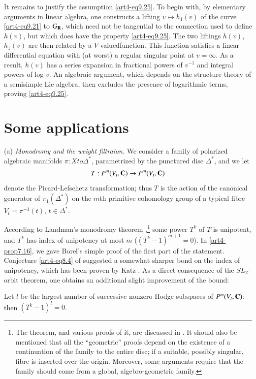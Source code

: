It remains to justify the assumption \eqref{art4-eq9.25}. To begin with, by elementary arguments in linear algebra, one constructs a lifting $v \longmapsto h_1 (v)$ of the curve \eqref{art4-eq9.21} to $G_{\mathbf{R}}$, which need not be tangential to the connection used to define $h(v)$, but which does have the property \eqref{art4-eq9.25}. The two liftings $h(v)$, $h_1 (v)$ are then related by a $V$-valued\pageoriginale function. This function satisfies a linear differential equation with (at worst) a regular singular point at $v = \infty$. As a result, $h(v)$ has a series expansion in fractional powers of $v^{-1}$ and integral powers of log $v$. An algebraic argument, which depends on the structure theory of a semisimple Lie algebra, then excludes the presence of logarithmic terms, proving \eqref{art4-eq9.25}.


\section{Some applications}\label{art4-sec10}
(a) \textit{Monodromy and the weight filtraion.} We consider a family of polarized algebraic manifolds $\pi: X to \Delta^\ast$, parametrized by the punctured disc $\Delta^\ast$, and we let
$$
T : P^m (V_t, \mathbf{C}) \to P^m (V_t, \mathbf{C})
$$
denote the Picard-Lefschetz transformation; thus $T$ is the action of the canonical generator of $\pi_1 (\Delta^\ast)$ on the $m$th primitive cohomology group of a typical fibre $V_t = \pi^{-1} (t)$, $ t \in \Delta^\ast$.
              
According to Landman's monodromy theorem \cite{art4-key35},\footnote[41]{The theorem, and various proofs of it, are discussed in \cite{art4-key21}. It should also be mentioned that all the ``geometric'' proofs depend on the existence of a continuation of the family to the entire disc; if a suitable, possibly singular, fibre is inserted over the origin. Moreover, some arguments require that the family should come from a global, algebro-geometric family.} some power $T^k$ of $T$ is unipotent, and $T^k$ has index of unipotency at most $m$ (\ie $(T^k -1)^{m+1} =0$). In \eqref{art4-prop7.16}, we gave Borel's simple proof of the first part of the statement. Conjecture \eqref{art4-eq8.4} of \cite{art4-key21} suggested a somewhat sharper bond on the index of unipotency, which has been proven by Katz \cite{art4-key31}. As a direct consequence of the $SL_2$-orbit theorem, one obtains an additional slight improvement of the bound:

\setcounter{equation}{0}
\begin{proposition}\label{art4-prop10.1}
Let $l$ be the largest number of successive nonzero Hodge subspaces of $P^m (V_t, \mathbf{C})$; then $(T^k - 1)^l = 0$.
\end{proposition}

